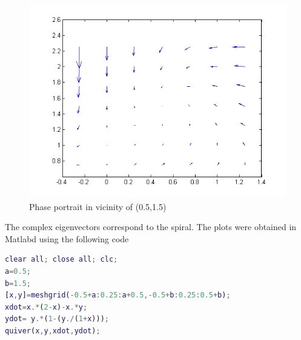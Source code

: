 \documentclass[a4paper]{article}
\begin{document}
\begin{enumerate}
\begin{enumerate}
\begin{figure}[H]
	\includegraphics[width=12cm]{half}
	\caption{Phase portrait in vicinity of (0.5,1.5) }
\end{figure}
	    The complex eigenvectors correspond to the spiral.	
The plots were obtained in Matlabd using the following code
\begin{lstlisting}[language=Matlab,frame=single]
clear all; close all; clc;
a=0.5;
b=1.5;
[x,y]=meshgrid(-0.5+a:0.25:a+0.5,-0.5+b:0.25:0.5+b);
xdot=x.*(2-x)-x.*y;
ydot= y.*(1-(y./(1+x)));
quiver(x,y,xdot,ydot);
\end{lstlisting}     	 	
\end{enumerate}


\end{enumerate}
\end{document}
